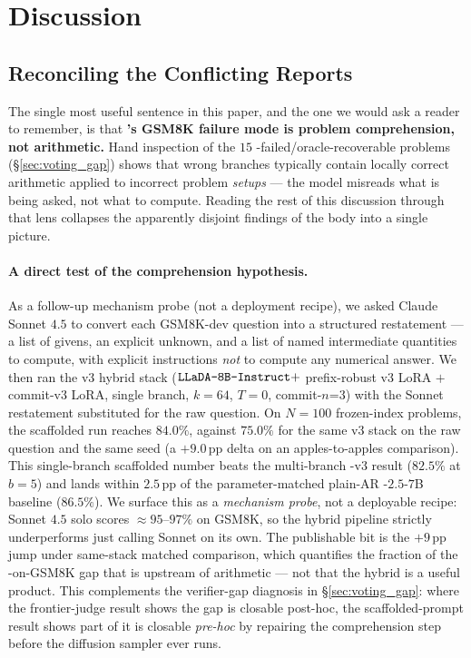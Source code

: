 \section{Discussion}
\label{sec:discussion}

\subsection{Reconciling the Conflicting Reports}
\label{subsec:reconciling}

The single most useful sentence in this paper, and the one we
would ask a reader to remember, is that
\textbf{\LLaDA{}'s GSM8K failure mode is problem comprehension,
not arithmetic.}  Hand inspection of the $15$
\cmaj{}-failed/oracle-recoverable problems
(\S\ref{sec:voting_gap}) shows that wrong branches typically
contain locally correct arithmetic applied to incorrect problem
\emph{setups} --- the model misreads what is being asked, not
what to compute.  Reading the rest of this discussion through
that lens collapses the apparently disjoint findings of the body
into a single picture.

\paragraph{A direct test of the comprehension hypothesis.}  As a
follow-up mechanism probe (not a deployment recipe), we asked
Claude Sonnet $4.5$ to convert each GSM$8$K-dev question into a
structured restatement --- a list of givens, an explicit unknown,
and a list of named intermediate quantities to compute, with
explicit instructions \emph{not} to compute any numerical answer.
We then ran the v3 hybrid stack
($\texttt{LLaDA-8B-Instruct} + $ prefix-robust v3 LoRA $+$ commit-v3
LoRA, single branch, $k{=}64$, $T{=}0$, commit-$n${=}$3$) with the
Sonnet restatement substituted for the raw question.  On
$N{=}100$ frozen-index problems, the scaffolded run reaches
$84.0\%$, against $75.0\%$ for the same v3 stack on the raw
question and the same seed (a $+9.0$\,pp delta on an
apples-to-apples comparison).  This single-branch scaffolded
number beats the multi-branch \cmajc{}-v3 result
($82.5\%$ at $b{=}5$) and lands within $2.5$\,pp of the
parameter-matched plain-AR \Qwen{}-$2.5$-$7$B baseline
($86.5\%$).  We surface this as a \emph{mechanism probe}, not
a deployable recipe: Sonnet $4.5$ solo scores
$\approx 95\text{--}97\%$ on GSM$8$K, so the hybrid pipeline
strictly underperforms just calling Sonnet on its own.  The
publishable bit is the $+9$\,pp jump under same-stack matched
comparison, which quantifies the fraction of the
\LLaDA{}-on-GSM$8$K gap that is upstream of arithmetic --- not
that the hybrid is a useful product.  This complements the
verifier-gap diagnosis in \S\ref{sec:voting_gap}: where the
frontier-judge result shows the gap is closable post-hoc, the
scaffolded-prompt result shows part of it is closable
\emph{pre-hoc} by repairing the comprehension step before the
diffusion sampler ever runs.


